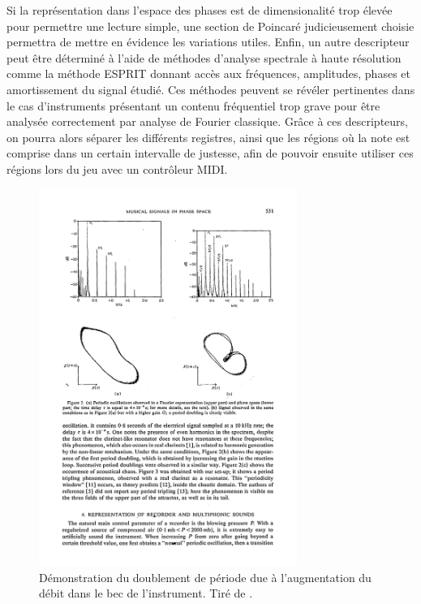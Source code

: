 \documentclass[atiam, article]{rapport} %
\begin{document}
Si la représentation dans l'espace des phases est de dimensionalité trop élevée pour permettre une lecture simple, une section de Poincaré judicieusement choisie permettra de mettre en évidence les variations utiles. 
Enfin, un autre descripteur peut être déterminé à l'aide de méthodes d'analyse spectrale à haute résolution comme la méthode ESPRIT \cite{ESPRIT} donnant accès aux fréquences, amplitudes, phases et amortissement du signal étudié.
Ces méthodes peuvent se révéler pertinentes dans le cas d'instruments présentant un contenu fréquentiel trop grave pour être analysée correctement par analyse de Fourier classique. Grâce à ces descripteurs, on pourra alors séparer les différents registres, ainsi que les régions où la note est comprise dans un certain intervalle de justesse, afin de pouvoir ensuite utiliser ces régions lors du jeu avec un contrôleur MIDI.

\begin{figure}
    \centering
    \includegraphics[trim=0 10.6cm 0 1.8cm, clip, width=0.75\textwidth]{report/Images/Gibiat_PhaseSpaceMusicalSignals_JSV_1988-p3.pdf}
    \caption{Démonstration du doublement de période due à l'augmentation du débit dans le bec de l'instrument. Tiré de \cite{gibiat_phase_1988}.}
    \label{fig:gibiat-double-period}
\end{figure}

\newpage

 {\hypersetup{hidelinks} \printbibliography }
\end{document}
